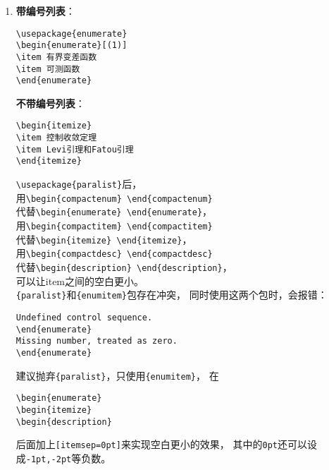 \documentclass{article}
\begin{document}
\begin{multicols}{2}
\begin{enumerate}
\item \textbf{带编号列表}：
\begin{lstlisting}
\usepackage{enumerate}
\begin{enumerate}[(1)]
\item 有界变差函数
\item 可测函数
\end{enumerate}
\end{lstlisting} 
\textbf{不带编号列表}：
\begin{lstlisting}
\begin{itemize}
\item 控制收敛定理
\item Levi引理和Fatou引理
\end{itemize}
\end{lstlisting} 
\verb|\usepackage{paralist}|后，\\
用\verb|\begin{compactenum} \end{compactenum}|\\
代替\verb|\begin{enumerate} \end{enumerate}|，\\
用\verb|\begin{compactitem} \end{compactitem}|\\
代替\verb|\begin{itemize} \end{itemize}|，\\
用\verb|\begin{compactdesc} \end{compactdesc}|\\
代替\verb|\begin{description} \end{description}|，\\
可以让item之间的空白更小。\\
\verb|{paralist}|和\verb|{enumitem}|包存在冲突，
同时使用这两个包时，会报错：
\begin{lstlisting}
Undefined control sequence. 
\end{enumerate}
Missing number, treated as zero. 
\end{enumerate}   
\end{lstlisting} 
建议抛弃\verb|{paralist}|，只使用\verb|{enumitem}|，
在
\begin{lstlisting}
\begin{enumerate}
\begin{itemize}
\begin{description}     
\end{lstlisting} 
后面加上\verb|[itemsep=0pt]|来实现空白更小的效果，
其中的\verb|0pt|还可以设成\verb|-1pt,-2pt|等负数。


\end{enumerate}
\end{multicols}
\end{document}
